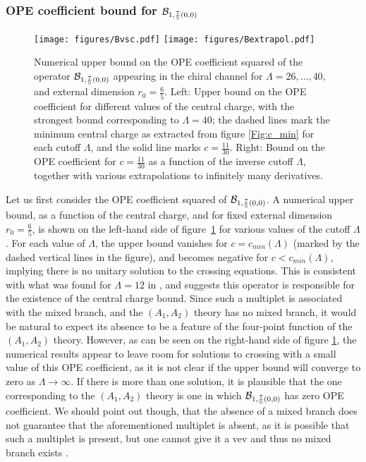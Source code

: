 \subsubsection*{OPE coefficient bound for ${\mathcal{B}}_{1,\frac75(0,0)}$}

\begin{figure}[htb!]
             \begin{center}           
              \texttt{[image: figures/Bvsc.pdf]}
               \texttt{[image: figures/Bextrapol.pdf]}
              \caption{Numerical upper bound on the OPE coefficient squared of the operator ${\mathcal{B}}_{1,\frac75(0,0)}$ appearing in the chiral channel for $\Lambda=26,\ldots,40$, and external dimension $r_0=\frac65$. Left: Upper bound on the OPE coefficient for different values of the central charge, with the strongest bound corresponding to $\Lambda=40$; the dashed lines mark the minimum central charge as extracted from figure \ref{Fig:c_min} for each cutoff $\Lambda$, and the solid line marks $c=\tfrac{11}{30}$. Right: Bound on the OPE coefficient for $c=\tfrac{11}{30}$ as a function of the inverse cutoff $\Lambda$, together with various extrapolations to infinitely many derivatives.}
              \label{Fig:Bbound}
            \end{center}
\end{figure}

Let us first consider the OPE coefficient squared of ${\mathcal{B}}_{1,\frac75(0,0)}$. A numerical upper bound, as a function of the central charge, and for fixed external dimension $r_0=\frac65$, is shown on the left-hand side of figure~\ref{Fig:Bbound} for various values of the cutoff $\Lambda$. For each value of $\Lambda$, the upper bound vanishes for $c=c_{min}(\Lambda)$ (marked by the dashed vertical lines in the figure), and becomes negative for $c<c_{min}(\Lambda)$, implying there is no unitary solution to the crossing equations. This is consistent with what was found for $\Lambda=12$ in \cite{Lemos:2015awa}, and suggests this operator is responsible for the existence of the central charge bound.
Since such a multiplet is associated with the mixed branch, and the $(A_1,A_2)$ theory has no mixed branch, it 
would be natural to expect its absence to be a feature of the four-point function of the $(A_1,A_2)$ theory.
However, as can be seen on the right-hand side of figure \ref{Fig:Bbound},
the numerical results appear to leave room for solutions to crossing with a small value of this OPE coefficient, as it is not clear if the upper bound will converge to zero as $\Lambda \to \infty$.
If there is more than one solution, it is plausible that the one corresponding to the $(A_1,A_2)$ theory is one in which ${\mathcal{B}}_{1,\frac75(0,0)}$ has zero OPE coefficient. We should point out though, that the absence of a mixed branch does not guarantee that the aforementioned multiplet is absent, as it is possible that such a multiplet is present, but one cannot give it a vev and thus no mixed branch exists \cite{Tachikawa:2013kta,Argyres:2015ffa}. 


